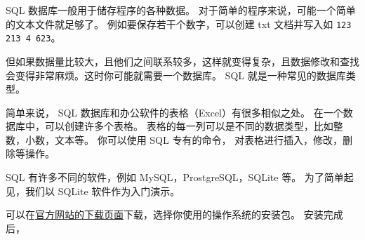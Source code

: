 
SQL 数据库一般用于储存程序的各种数据。 对于简单的程序来说，可能一个简单的文本文件就足够了。 例如要保存若干个数字，可以创建 txt 文档并写入如 \verb|123 213 4 623|。

但如果数据量比较大，且他们之间联系较多，这样就变得复杂，且数据修改和查找会变得非常麻烦。这时你可能就需要一个数据库。 SQL 就是一种常见的数据库类型。

简单来说， SQL 数据库和办公软件的表格（Excel）有很多相似之处。 在一个数据库中，可以创建许多个表格。 表格的每一列可以是不同的数据类型，比如整数，小数，文本等。 你可以使用 SQL 专有的命令， 对表格进行插入，修改，删除等操作。

SQL 有许多不同的软件，例如 MySQL，ProstgreSQL，SQLite 等。 为了简单起见，我们以 SQLite 软件作为入门演示。

可以在\href{https://sqlitebrowser.org/dl/}{官方网站的下载页面}下载，选择你使用的操作系统的安装包。 安装完成后，







